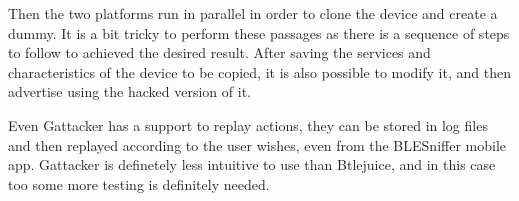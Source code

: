 Then the two platforms run in parallel in order to clone the device and create a dummy.
It is a bit tricky to perform these passages as there is a sequence of steps to follow to achieved the desired result.
After saving the services and characteristics of the device to be copied, it is also possible to modify it, and then advertise using the hacked version of it.

Even Gattacker has a support to replay actions, they can be stored in log files and then replayed according to the user wishes, even from the BLESniffer mobile app.
Gattacker is definetely less intuitive to use than Btlejuice, and in this case too some more testing is definitely needed.